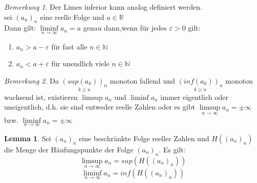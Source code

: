 \documentclass[12pt,a4paper,titlepage]{article} %
\theoremstyle{definition}
\newtheorem{lem}[satz]{Lemma}
\theoremstyle{remark}
\newtheorem*{bem}{Bemerkung}
\newcommand{\N}{\mathbb{N}}
\newcommand{\R}{\mathbb{R}}
\newcommand{\limessup}[1]{\limsup \limits_{#1\rightarrow\infty}}
\newcommand{\limesinf}[1]{\liminf \limits_{#1\rightarrow\infty}}
\begin{document}
	\begin{bem}
		Der Limes inferior kann analog definiert werden.\\
		sei \((a_n)_n\) eine reelle Folge und \(a \in \R\)\\
		Dann gilt: \(\limesinf{n} a_n = a\) genau dann,wenn für jedes \(\varepsilon > 0\) gilt:
		\begin{enumerate}
			\item \(a_n > a - \varepsilon\) für fast alle \(n \in \N\)
			\item \(a_n < a + \varepsilon\) für unendlich viele \(n \in \N\)
		\end{enumerate}
	\end{bem}
	\begin{bem}
		Da \(\underset{k \geq n}{(sup(a_k))_n}\) monoton fallend und \(\underset{k \geq n}{(inf(a_k))_n}\) monoton wachsend ist, existieren \(\limsup a_n \) und \(\liminf a_n\) immer eigentlich oder uneigentlich, d.h. sie sind entweder reelle Zahlen oder es gibt \(\limessup{n} a_n = \pm \infty \) bzw. \(\limesinf{n} a_n = \pm \infty \) 
	\end{bem}
	\begin{lem}
		Sei \((a_n)_n\) eine beschränkte Folge reeller Zahlen und \(H((a_n)_n)\) die Menge der Häufungspunkte der Folge \((a_n)_n\). Es gilt:\\
		\[\limessup{n} a_n = sup(H((a_n)_n))\]
		\[\limesinf{n} a_n = inf(H((a_n)_n))\]
	\end{lem}
\end{document}
